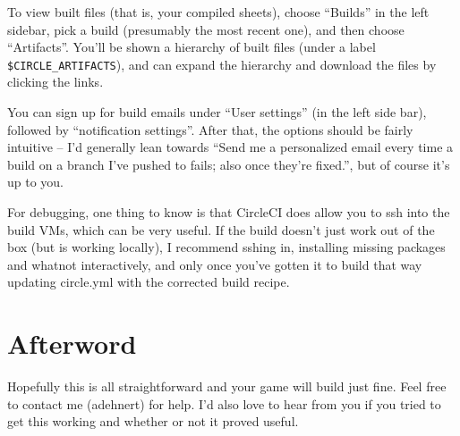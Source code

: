 \documentclass[green]{testgame}
\begin{document}
To view built files (that is, your compiled sheets), choose ``Builds'' in the left sidebar, pick a build (presumably the most recent one), and then choose ``Artifacts''. You'll be shown a hierarchy of built files (under a label \verb|$CIRCLE_ARTIFACTS|), and can expand the hierarchy and download the files by clicking the links.

You can sign up for build emails under ``User settings'' (in the left side bar), followed by ``notification settings''. After that, the options should be fairly intuitive -- I'd generally lean towards ``Send me a personalized email every time a build on a branch I've pushed to fails; also once they're fixed.'', but of course it's up to you.

For debugging, one thing to know is that CircleCI does allow you to ssh into the build VMs, which can be very useful. If the build doesn't just work out of the box (but is working locally), I recommend sshing in, installing missing packages and whatnot interactively, and only once you've gotten it to build that way updating circle.yml with the corrected build recipe.

\section{Afterword}

Hopefully this is all straightforward and your game will build just fine. Feel free to contact me (adehnert) for help. I'd also love to hear from you if you tried to get this working and whether or not it proved useful.
\end{document}
